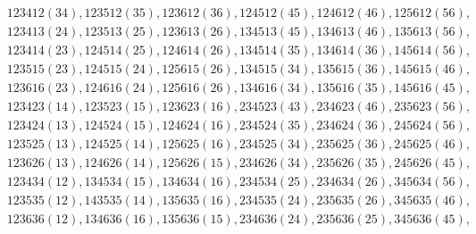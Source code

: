 \documentclass[aps, preprint]{revtex4}
\begin{document}
\begin{align} & 123412 \left (34\right ) ,123512 \left (35\right ) ,123612 \left (36\right ) ,124512 \left (45\right ) ,124612 \left (46\right ) ,125612 \left (56\right ) , \nonumber  \\
 & 123413 \left (24\right ) ,123513 \left (25\right ) ,123613 \left (26\right ) ,134513 \left (45\right ) ,134613 \left (46\right ) ,135613 \left (56\right ) , \nonumber  \\
 & 123414 \left (23\right ) ,124514 \left (25\right ) ,124614 \left (26\right ) ,134514 \left (35\right ) ,134614 \left (36\right ) ,145614 \left (56\right ) , \nonumber  \\
 & 123515 \left (23\right ) ,124515 \left (24\right ) ,125615 \left (26\right ) ,134515 \left (34\right ) ,135615 \left (36\right ) ,145615 \left (46\right ) , \nonumber  \\
 & 123616 \left (23\right ) ,124616 \left (24\right ) ,125616 \left (26\right ) ,134616 \left (34\right ) ,135616 \left (35\right ) ,145616 \left (45\right )\text{,}\end{align}
\begin{align*} & 123423 \left (14\right ) ,123523 \left (15\right ) ,123623 \left (16\right ) ,234523 \left (43\right ) ,234623 \left (46\right ) ,235623 \left (56\right )\text{,} \\
 & 123424 \left (13\right ) ,124524 \left (15\right ) ,124624 \left (16\right ) ,234524 \left (35\right ) ,234624 \left (36\right ) ,245624 \left (56\right )\text{,} \\
 & 123525 \left (13\right ) ,124525 \left (14\right ) ,125625 \left (16\right ) ,234525 \left (34\right ) ,235625 \left (36\right ) ,245625 \left (46\right )\text{,} \\
 & 123626 \left (13\right ) ,124626 \left (14\right ) ,125626 \left (15\right ) ,234626 \left (34\right ) ,235626 \left (35\right ) ,245626 \left (45\right )\text{,}\end{align*}
\begin{align*} & 123434 \left (12\right ) ,134534 \left (15\right ) ,134634 \left (16\right ) ,234534 \left (25\right ) ,234634 \left (26\right ) ,345634 \left (56\right )\text{,} \\
 & 123535 \left (12\right ) ,143535 \left (14\right ) ,135635 \left (16\right ) ,234535 \left (24\right ) ,235635 \left (26\right ) ,345635 \left (46\right )\text{,} \\
 & 123636 \left (12\right ) ,134636 \left (16\right ) ,135636 \left (15\right ) ,234636 \left (24\right ) ,235636 \left (25\right ) ,345636 \left (45\right )\text{,}\end{align*}
\end{document}
